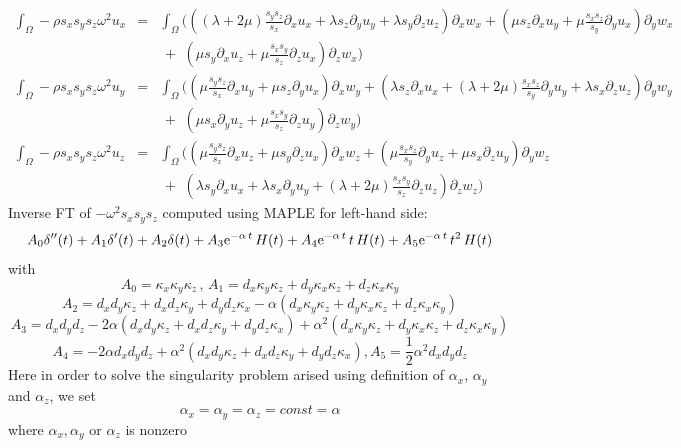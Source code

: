 \documentclass[onecolumn,extra]{gji_modified_cours_UPPA}
\begin{document}
\begin{eqnarray}
%
\int_\Omega -\rho s_x s_y s_z \omega^2 u_x & = & \int_\Omega \Bigg(((\lambda + 2 \mu)\frac{s_y s_z}{s_x}\partial_x u_x + \lambda s_z \partial_y u_y + \lambda s_y \partial_z u_z) \partial_x w_x
+ (\mu s_z \partial_x u_y + \mu \frac{s_x s_z}{s_y} \partial_y u_x) \partial_y w_x   \nonumber  \\
&\,& \,+\,\, (\mu s_y \partial_x u_z + \mu \frac{s_x s_y}{s_z}\partial_z u_x) \partial_z w_x \Bigg) \nonumber \\
%
\int_\Omega -\rho s_x s_y s_z \omega^2 u_y  & = & \int_\Omega \Bigg((\mu \frac{s_y s_z}{s_x} \partial_x u_y + \mu s_z \partial_y u_x )\partial_x w_y
+ (\lambda s_z \partial_x u_x + (\lambda + 2 \mu)\frac{s_x s_z}{s_y}\partial_y u_y + \lambda s_x \partial_z u_z) \partial_y w_y  \nonumber \\
&\,& \,+\,\, ( \mu s_x \partial_y u_z + \mu \frac{s_x s_y}{s_z} \partial_z u_y) \partial_z w_y  \Bigg) \nonumber \\
%
\int_\Omega - \rho s_x s_y s_z \omega^2 u_z  & = & \int_\Omega \Bigg( ( \mu \frac{s_y s_z}{s_x} \partial_x u_z + \mu s_y \partial_z u_x ) \partial_x w_z
+ ( \mu \frac{s_x s_z}{s_y} \partial_y u_z + \mu s_x \partial_z u_y ) \partial_y w_z   \nonumber \\
&\,& \,+\,\,( \lambda s_y\partial_x u_x + \lambda s_x \partial_y u_y + (\lambda + 2 \mu)\frac{s_x s_y}{s_z}\partial_z u_z) \partial_z w_z \Bigg)
\end{eqnarray}
%
\noindent
Inverse FT of $- \omega^2 s_x s_y s_z$ computed using MAPLE for left-hand side:
$$A_0 \delta''(t) + A_1 \delta'(t) + A_2 \delta(t)
+ A_3 {\rm e}^{-\alpha\,t} \, H(t)
+ A_4 {\rm e}^{-\alpha\,t} \,t\, H(t)
+ A_5 {\rm e}^{-\alpha\,t} \,t^{2} \,H(t)$$
with
$$A_0 = \kappa_x \kappa_y \kappa_z \, , \, A_1 =d_x \kappa_y \kappa_z + d_y \kappa_x \kappa_z + d_z \kappa_x \kappa_y $$
$$A_2 = d_x d_y \kappa_z +d_x d_z \kappa_y + d_y d_z \kappa_x-\alpha( d_x \kappa_y \kappa_z + d_y \kappa_x \kappa_z + d_z \kappa_x \kappa_y)$$
$$A_3= d_x d_y d_z - 2 \alpha  (d_x d_y \kappa_z +d_x d_z \kappa_y + d_y d_z \kappa_x  )
      +\alpha ^2 (d_x \kappa_y \kappa_z +  d_y \kappa_x \kappa_z + d_z \kappa_x \kappa_y) $$
$$A_4= -2 \alpha  d_x d_y d_z+\alpha ^2 (d_x d_y \kappa_z + d_x d_z \kappa_y + d_y d_z \kappa_x), A_5=\frac{1}{2} \alpha ^2 d_x d_y d_z$$
Here in order to solve the singularity problem arised using definition of $\alpha_x$, $\alpha_y$ and $\alpha_z$, we set $$\alpha_x=\alpha_y=\alpha_z=const=\alpha$$
where $\alpha_x, \alpha_y$ or $\alpha_z$  is nonzero \\
\end{document}
